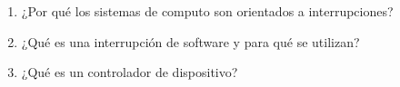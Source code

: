 \documentclass[12pt]{article}
\begin{document}
\begin{enumerate}
    \textbf{}
    \item ¿Por qué los sistemas de computo son orientados a interrupciones?
    \vspace{2mm}

    \textbf{}
    \item ¿Qué es una interrupción de software y para qué se utilizan?
    \vspace{2mm}

    \textbf{}
    \item ¿Qué es un controlador de dispositivo?
    \vspace{2mm}

    \textbf{} 
\end{enumerate}
\end{document}
